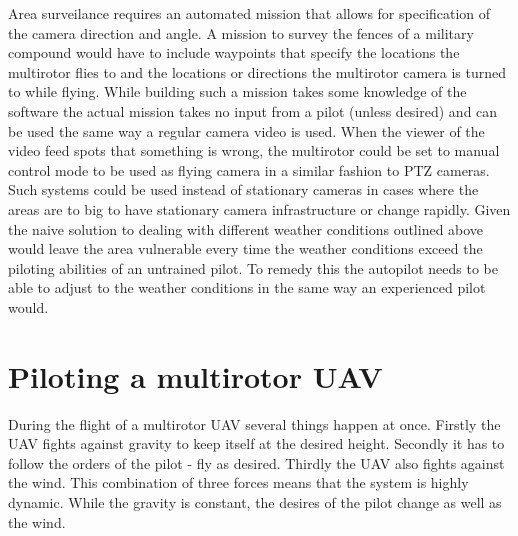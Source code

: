 \documentclass[12pt,oneside]{reedthesis}
\theoremstyle{definition}
\theoremstyle{definition}
\theoremstyle{definition}
\theoremstyle{remark}
\begin{document}
Area surveilance requires an automated mission that allows for
specification of the camera direction and angle. A mission to survey the
fences of a military compound would have to include waypoints that
specify the locations the multirotor flies to and the locations or
directions the multirotor camera is turned to while flying. While
building such a mission takes some knowledge of the software the actual
mission takes no input from a pilot (unless desired) and can be used the
same way a regular camera video is used. When the viewer of the video
feed spots that something is wrong, the multirotor could be set to
manual control mode to be used as flying camera in a similar fashion to
PTZ cameras. Such systems could be used instead of stationary cameras in
cases where the areas are to big to have stationary camera
infrastructure or change rapidly. Given the naive solution to dealing
with different weather conditions outlined above would leave the area
vulnerable every time the weather conditions exceed the piloting
abilities of an untrained pilot. To remedy this the autopilot needs to
be able to adjust to the weather conditions in the same way an
experienced pilot would.

\chapter{Piloting a multirotor UAV}\label{piloting}

During the flight of a multirotor UAV several things happen at once.
Firstly the UAV fights against gravity to keep itself at the desired
height. Secondly it has to follow the orders of the pilot - fly as
desired. Thirdly the UAV also fights against the wind. This combination
of three forces means that the system is highly dynamic. While the
gravity is constant, the desires of the pilot change as well as the
wind.
\end{document}
